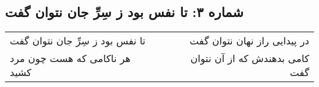 \begin{center}
\section*{شماره ۳: تا نفس بود ز سِرِّ جان نتوان گفت}
\label{sec:003}
\begin{longtable}{l p{0.5cm} r}
تا نفس بود ز سِرِّ جان نتوان گفت
&&
در پیدایی راز نهان نتوان گفت
\\
هر ناکامی که هست چون مرد کشید
&&
کامی بدهندش که از آن نتوان گفت
\\
\end{longtable}
\end{center}
